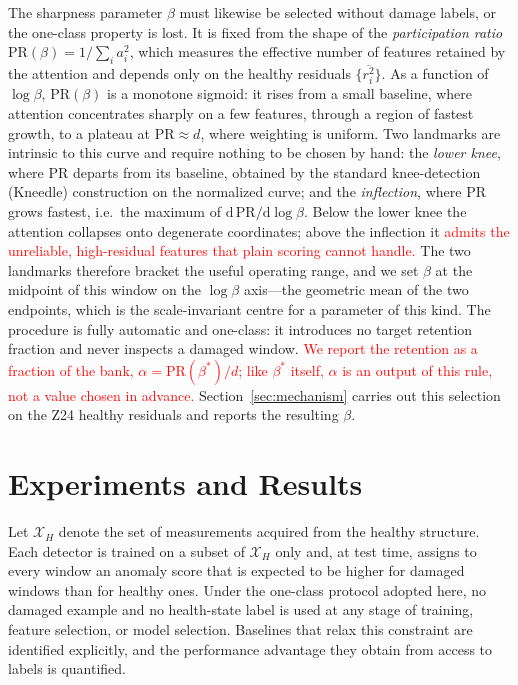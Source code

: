 \documentclass[11pt,a4paper]{article}
\begin{document}
The sharpness parameter $\beta$ must likewise be selected without damage labels, or the
one-class property is lost. It is fixed from the shape of the
\emph{participation ratio} $\mathrm{PR}(\beta) = 1/\sum_i a_i^2$, which measures
the effective number of features retained by the attention and depends only on
the healthy residuals $\{\overline{r_i^2}\}$. As a function of $\log\beta$,
$\mathrm{PR}(\beta)$ is a monotone sigmoid: it rises from a
small baseline, where attention concentrates sharply on a few features,
through a region of fastest growth, to a plateau at $\mathrm{PR}\!\approx\!d$,
where weighting is uniform. Two landmarks are
intrinsic to this curve and require nothing to be chosen by hand: the \emph{lower knee},
where $\mathrm{PR}$ departs from its baseline, obtained by the standard
knee-detection (Kneedle) construction on the normalized curve; and the
\emph{inflection}, where $\mathrm{PR}$ grows fastest, i.e.\ the maximum of
$\mathrm{d}\,\mathrm{PR}/\mathrm{d}\!\log\beta$. Below the lower knee the
attention collapses onto degenerate coordinates; above the inflection it
\textcolor{red}{admits the unreliable, high-residual features that plain
scoring cannot handle.} The two landmarks therefore bracket the useful operating range, and we
set $\beta$ at the midpoint of this window on the $\log\beta$ axis---the
geometric mean of the two endpoints, which is the scale-invariant centre for a
parameter of this kind. The procedure is fully automatic and one-class: it
introduces no target retention fraction and never inspects a damaged window.
\textcolor{red}{We report the retention as a fraction of the bank,
$\alpha = \mathrm{PR}(\beta^{*})/d$; like $\beta^{*}$ itself, $\alpha$ is an
output of this rule, not a value chosen in advance.}
Section~\ref{sec:mechanism} carries out this selection on the Z24 healthy
residuals and reports the resulting $\beta$.

\section{Experiments and Results}
\label{sec:data}

Let $\mathcal{X}_H$ denote the set of measurements acquired from the healthy
structure. Each detector is trained on a subset of $\mathcal{X}_H$ only and, at
test time, assigns to every window an anomaly score that is expected to be
higher for damaged windows than for healthy ones. Under the one-class protocol
adopted here, no damaged example and no health-state label is used at any stage
of training, feature selection, or model selection. Baselines that relax this
constraint are identified explicitly, and the performance advantage they obtain
from access to labels is quantified.
\end{document}
